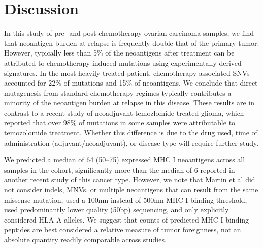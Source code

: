 \section*{Discussion}

In this study of pre- and post-chemotherapy ovarian carcinoma samples, we find that neoantigen burden at relapse is frequently double that of the primary tumor. However, typically less than 5\% of the neoantigens after treatment can be attributed to chemotherapy-induced mutations using experimentally-derived signatures. In the most heavily treated patient, chemotherapy-associated SNVs accounted for 22\% of mutations and 15\% of neoantigens. We conclude that direct mutagenesis from standard chemotherapy regimes typically contributes a minority of the neoantigen burden at relapse in this disease. These results are in contrast to a recent study of neoadjuvant temozlomide-treated glioma\cite{Johnson_2013}, which reported that over 98\% of mutations in some samples were attributable to temozolomide treatment. Whether this difference is due to the drug used, time of administration (adjuvant/neoadjuvant), or disease type will require further study.




We predicted a median of 64 (50--75) expressed MHC I neoantigens across all samples in the cohort, significantly more than the median of 6 reported in another recent study of this cancer type\cite{Martin_2016}. However, we note that Martin et al did not consider indels, MNVs, or multiple neoantigens that can result from the same missense mutation, used a 100nm instead of 500nm MHC I binding threshold, used predominantly lower quality (50bp) sequencing, and only explicitly considered HLA-A alleles. We suggest that counts of predicted MHC I binding peptides are best considered a relative measure of tumor foreignness, not an absolute quantity readily comparable across studies.

